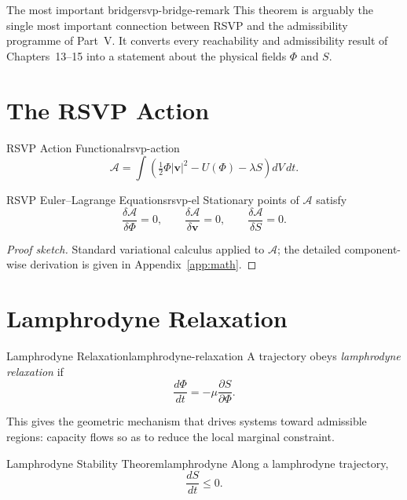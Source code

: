 \documentclass[12pt,twoside,openright]{book}
\begin{document}
\begin{remark}{The most important bridge}{rsvp-bridge-remark}
  This theorem is arguably the single most important
  connection between RSVP and the admissibility programme
  of Part~V. It converts every reachability and
  admissibility result of Chapters~13--15 into a statement
  about the physical fields $\Phi$ and $S$.
\end{remark}

\section{The RSVP Action}
\label{sec:ch16-action}

\begin{definition}{RSVP Action Functional}{rsvp-action}
  \[
    \mathcal{A}
    = \int \left(
        \tfrac{1}{2}\Phi|\mathbf{v}|^2
        - U(\Phi)
        - \lambda S
      \right) dV \, dt.
  \]
\end{definition}

\begin{theorem}{RSVP Euler--Lagrange Equations}{rsvp-el}
  Stationary points of $\mathcal{A}$ satisfy
  \[
    \frac{\delta\mathcal{A}}{\delta\Phi} = 0,
    \qquad
    \frac{\delta\mathcal{A}}{\delta\mathbf{v}} = 0,
    \qquad
    \frac{\delta\mathcal{A}}{\delta S} = 0.
  \]
\end{theorem}

\begin{proof}[Proof sketch]
  Standard variational calculus applied to $\mathcal{A}$;
  the detailed component-wise derivation is given in
  Appendix~\ref{app:math}.
\end{proof}

\section{Lamphrodyne Relaxation}
\label{sec:ch16-lamphrodyne}

\begin{definition}{Lamphrodyne Relaxation}{lamphrodyne-relaxation}
  A trajectory obeys \emph{lamphrodyne relaxation} if
  \[
    \frac{d\Phi}{dt}
    = -\mu \frac{\partial S}{\partial \Phi}.
  \]
\end{definition}

This gives the geometric mechanism that drives systems
toward admissible regions: capacity flows so as to reduce
the local marginal constraint.

\begin{theorem}{Lamphrodyne Stability Theorem}{lamphrodyne}
  Along a lamphrodyne trajectory,
  \[
    \frac{dS}{dt} \le 0.
  \]
\end{theorem}
\end{document}
